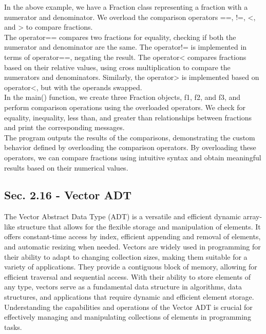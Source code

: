 \begin{solution}
    In the above example, we have a Fraction class representing a fraction with a numerator and denominator. We overload the comparison operators ==, !=, <, and > to compare fractions. \\

    \noindent The operator== compares two fractions for equality, checking if both the numerator and denominator are the same. The operator!= is implemented in terms of operator==, negating the result. The operator< compares fractions based on their relative values, using cross multiplication to compare the numerators and 
    denominators. Similarly, the operator> is implemented based on operator<, but with the operands swapped. \\

    \noindent In the main() function, we create three Fraction objects, f1, f2, and f3, and perform comparison operations using the overloaded operators. We check for equality, inequality, less than, and greater than relationships between fractions and print the corresponding messages. \\

    \noindent The program outputs the results of the comparisons, demonstrating the custom behavior defined by overloading the comparison operators. By overloading these operators, we can compare fractions using intuitive syntax and obtain meaningful results based on their numerical values. \\
\end{solution}

\subsection*{Sec. 2.16 - Vector ADT}

The Vector Abstract Data Type (ADT) is a versatile and efficient dynamic array-like structure that allows for the flexible storage and manipulation of elements. It offers constant-time access by index, efficient appending and removal of elements, and automatic resizing when needed. Vectors are widely used in programming for 
their ability to adapt to changing collection sizes, making them suitable for a variety of applications. They provide a contiguous block of memory, allowing for efficient traversal and sequential access. With their ability to store elements of any type, vectors serve as a fundamental data structure in algorithms, data structures, 
and applications that require dynamic and efficient element storage. Understanding the capabilities and operations of the Vector ADT is crucial for effectively managing and manipulating collections of elements in programming tasks. \\


